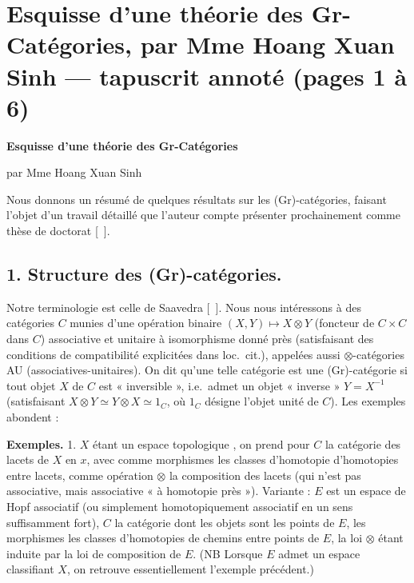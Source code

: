 \documentclass[11pt,a4paper]{article}
\begin{document}
\section*{Esquisse d'une théorie des Gr-Catégories, par Mme Hoang Xuan Sinh --- tapuscrit annoté (pages 1 à 6)}


\textbf{Esquisse d'une théorie des Gr-Catégories}

par Mme Hoang Xuan Sinh

Nous donnons un résumé de quelques résultats sur les (Gr)-catégories,
faisant l'objet d'un travail détaillé que l'auteur compte présenter
prochainement comme thèse de doctorat [\ ].

\subsection*{1. Structure des (Gr)-catégories.}

Notre terminologie est celle de Saavedra [\ ]. Nous nous intéressons à des
catégories $C$ munies d'une opération binaire $(X,Y) \mapsto X \otimes Y$
(foncteur de $C \times C$ dans $C$) associative et unitaire à isomorphisme
donné près (satisfaisant des conditions de compatibilité explicitées dans
loc.\ cit.), appelées aussi $\otimes$-catégories AU
(associatives-unitaires). On dit qu'une telle catégorie est une
(Gr)-catégorie si  tout objet $X$ de $C$ est
« inversible », i.e.\ admet un objet « inverse » $Y = X^{-1}$ (satisfaisant
$X \otimes Y \simeq Y \otimes X \simeq 1_C$, où $1_C$ désigne l'objet unité
de $C$). Les exemples abondent :

\textbf{Exemples.} 1. $X$ étant un espace topologique , on prend pour $C$ la catégorie des lacets de $X$ en $x$, avec comme
morphismes les classes d'homotopie d'homotopies entre lacets, comme
opération $\otimes$ la composition des lacets (qui n'est pas associative,
mais associative « à homotopie près »). Variante : $E$ est un espace de Hopf
associatif (ou simplement homotopiquement associatif en un sens suffisamment
fort), $C$ la catégorie dont les objets sont les points de $E$, les
morphismes les classes d'homotopies de chemins entre points de $E$, la loi
$\otimes$ étant induite par la loi de composition de $E$. (NB Lorsque $E$
admet un espace classifiant $X$, on retrouve essentiellement l'exemple
précédent.) \struck{\ill{}}
\end{document}

